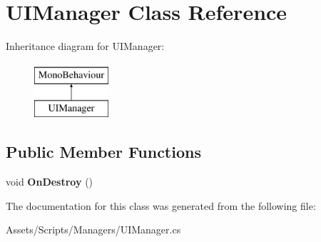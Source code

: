 \hypertarget{class_u_i_manager}{}\section{U\+I\+Manager Class Reference}
\label{class_u_i_manager}
Inheritance diagram for U\+I\+Manager\+:\begin{figure}[H]
\begin{center}
\leavevmode
\includegraphics[height=2.000000cm]{class_u_i_manager}
\end{center}
\end{figure}
\subsection*{Public Member Functions}
\begin{DoxyCompactItemize}
\item 
void {\bfseries On\+Destroy} ()\hypertarget{class_u_i_manager_a03255ab474c26f8da63d87821decd3e1}{}\label{class_u_i_manager_a03255ab474c26f8da63d87821decd3e1}

\end{DoxyCompactItemize}


The documentation for this class was generated from the following file\+:\begin{DoxyCompactItemize}
\item 
Assets/\+Scripts/\+Managers/U\+I\+Manager.\+cs\end{DoxyCompactItemize}
